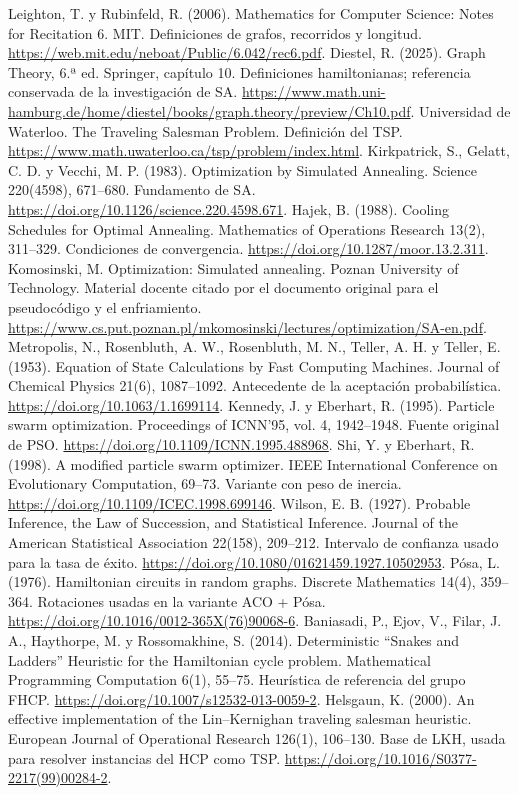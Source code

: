  Leighton, T. y Rubinfeld, R. (2006). Mathematics for Computer Science: Notes for Recitation 6. MIT. Definiciones de grafos, recorridos y longitud. \url{https://web.mit.edu/neboat/Public/6.042/rec6.pdf}.
 Diestel, R. (2025). Graph Theory, 6.ª ed. Springer, capítulo 10. Definiciones hamiltonianas; referencia conservada de la investigación de SA. \url{https://www.math.uni-hamburg.de/home/diestel/books/graph.theory/preview/Ch10.pdf}.
 Universidad de Waterloo. The Traveling Salesman Problem. Definición del TSP. \url{https://www.math.uwaterloo.ca/tsp/problem/index.html}.
 Kirkpatrick, S., Gelatt, C. D. y Vecchi, M. P. (1983). Optimization by Simulated Annealing. Science 220(4598), 671--680. Fundamento de SA. \url{https://doi.org/10.1126/science.220.4598.671}.
 Hajek, B. (1988). Cooling Schedules for Optimal Annealing. Mathematics of Operations Research 13(2), 311--329. Condiciones de convergencia. \url{https://doi.org/10.1287/moor.13.2.311}.
 Komosinski, M. Optimization: Simulated annealing. Poznan University of Technology. Material docente citado por el documento original para el pseudocódigo y el enfriamiento. \url{https://www.cs.put.poznan.pl/mkomosinski/lectures/optimization/SA-en.pdf}.
 Metropolis, N., Rosenbluth, A. W., Rosenbluth, M. N., Teller, A. H. y Teller, E. (1953). Equation of State Calculations by Fast Computing Machines. Journal of Chemical Physics 21(6), 1087--1092. Antecedente de la aceptación probabilística. \url{https://doi.org/10.1063/1.1699114}.
 Kennedy, J. y Eberhart, R. (1995). Particle swarm optimization. Proceedings of ICNN'95, vol. 4, 1942--1948. Fuente original de PSO. \url{https://doi.org/10.1109/ICNN.1995.488968}.
 Shi, Y. y Eberhart, R. (1998). A modified particle swarm optimizer. IEEE International Conference on Evolutionary Computation, 69--73. Variante con peso de inercia. \url{https://doi.org/10.1109/ICEC.1998.699146}.
 Wilson, E. B. (1927). Probable Inference, the Law of Succession, and Statistical Inference. Journal of the American Statistical Association 22(158), 209--212. Intervalo de confianza usado para la tasa de éxito. \url{https://doi.org/10.1080/01621459.1927.10502953}.
 Pósa, L. (1976). Hamiltonian circuits in random graphs. Discrete Mathematics 14(4), 359--364. Rotaciones usadas en la variante ACO + Pósa. \url{https://doi.org/10.1016/0012-365X(76)90068-6}.
 Baniasadi, P., Ejov, V., Filar, J. A., Haythorpe, M. y Rossomakhine, S. (2014). Deterministic ``Snakes and Ladders'' Heuristic for the Hamiltonian cycle problem. Mathematical Programming Computation 6(1), 55--75. Heurística de referencia del grupo FHCP. \url{https://doi.org/10.1007/s12532-013-0059-2}.
 Helsgaun, K. (2000). An effective implementation of the Lin--Kernighan traveling salesman heuristic. European Journal of Operational Research 126(1), 106--130. Base de LKH, usada para resolver instancias del HCP como TSP. \url{https://doi.org/10.1016/S0377-2217(99)00284-2}.
